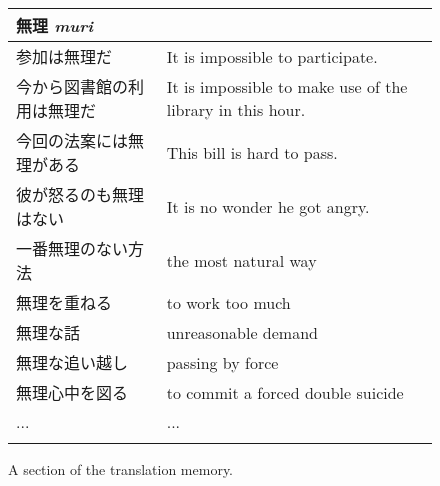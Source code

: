 \begin{figure*}[t]
\begin{center}
\begin{small}
\begin{tabular}{l|l} \hline
 \multicolumn{1}{l}{無理 {\it muri}} \\ \hline
 参加は無理だ &
 It is impossible to participate. \\
 今から図書館の利用は無理だ &
 It is impossible to make use of the library in this hour. \\
 今回の法案には無理がある &
 This bill is hard to pass. \\
 彼が怒るのも無理はない &
 It is no wonder he got angry.  \\
 一番無理のない方法 &
 the most natural way \\
 無理を重ねる &
 to work too much \\
 無理な話 &
 unreasonable demand \\
 無理な追い越し &
 passing by force \\
 無理心中を図る &
 to commit a forced double suicide  \\
 ... & ... \\ 
 \\ \hline
\end{tabular}
\end{small}
\end{center}
\vspace{-10pt}
\caption{A section of the translation memory.}
\label{fig:TM}
\end{figure*}

